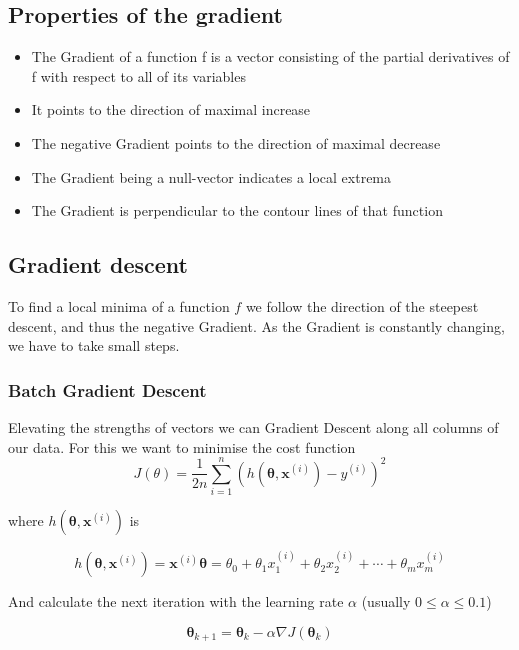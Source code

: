 \documentclass[11pt]{article}
\begin{document}
\subsection{Properties of the gradient}
\begin{itemize}
    \item The Gradient of a function f is a vector consisting of the partial derivatives of f with respect to all of its variables
    \item It points to the direction of maximal increase
    \item The negative Gradient points to the direction of maximal decrease
    \item The Gradient being a null-vector indicates a local extrema
    \item The Gradient is perpendicular to the contour lines of that function
\end{itemize}

\subsection{Gradient descent}
To find a local minima of a function $f$ we follow the direction of the steepest descent, and thus the negative Gradient. As the Gradient is constantly changing, we have to take small steps.

\subsubsection{Batch Gradient Descent}
Elevating the strengths of vectors we can Gradient Descent along all columns of our data. For this we want to minimise the cost function
\begin{equation}
    J(\theta) = \frac{1}{2n}\sum_{i=1}^{n}(h(\bm{\theta},\textbf{x}^{(i)})-y^{(i)})^2
\end{equation}

where $h(\bm{\theta},\textbf{x}^{(i)})$ is

\begin{equation}
    h(\bm{\theta},\bm{x}^{(i)}) = \bm{x}^{(i)}\bm{\theta} = \theta_0 + \theta_1 x^{(i)}_1 + \theta_2 x^{(i)}_2 + \cdots + \theta_m x^{(i)}_m
\end{equation}

And calculate the next iteration with the learning rate $\alpha$ (usually $0\leq\alpha\leq0.1$)

\begin{equation}
    \bm{\theta}_{k+1} = \bm{\theta}_{k} -\alpha\nabla J(\bm{\theta}_k)
\end{equation}
\end{document}
